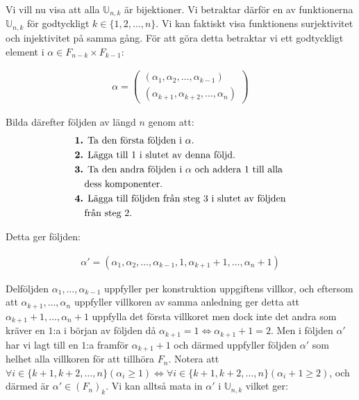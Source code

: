 \documentclass{tufte-handout}
\begin{document}
\begin{ans}
    \vspace{3mm}
    
    Vi vill nu visa att alla $\mathbb{U}_{n, k}$ är bijektioner. Vi betraktar därför en av funktionerna $\mathbb{U}_{n, k}$ för godtyckligt $k \in \{1, 2, \ldots, n\}$. Vi kan faktiskt visa funktionens surjektivitet och injektivitet på samma gång. För att göra detta betraktar vi ett godtyckligt element i $\alpha \in F_{n-k} \times F_{k-1}$:

    \vspace{-4mm}
    
    \begin{align*}
        \alpha = \begin{pmatrix} (\alpha_1, \alpha_2, \ldots, \alpha_{k-1}) \\ (\alpha_{k+1}, \alpha_{k+2}, \ldots, \alpha_{n}) \end{pmatrix}
    \end{align*}

    Bilda därefter följden av längd $n$ genom att:
    \begin{align*}
        &\text{\textbf{1.} Ta den första följden i $\alpha$.} \\
        &\text{\textbf{2.}  Lägga till $1$ i slutet av denna följd.} \\
        &\text{\textbf{3.}  Ta den andra följden i $\alpha$ och addera $1$ till alla} \\
        &\quad \text{dess komponenter.} \\
        &\text{\textbf{4.}  Lägga till följden från steg 3 i slutet av följden} \\
        &\quad \text{från steg 2.}
    \end{align*}

    Detta ger följden:

    \vspace{-4mm}
    
    \begin{align*}
        \alpha' = (\alpha_1, \alpha_2, \ldots, \alpha_{k-1}, 1, \alpha_{k+1} + 1, \ldots, \alpha_n + 1)
    \end{align*}

    Delföljden $\alpha_1, \ldots, \alpha_{k-1}$ uppfyller per konstruktion uppgiftens villkor, och eftersom att $\alpha_{k+1}, \ldots, \alpha_n$ uppfyller villkoren av samma anledning ger detta att $\alpha_{k+1} + 1, \ldots, \alpha_n + 1$ uppfylla det första villkoret men dock inte det andra som kräver en $1$:a i början av följden då $\alpha_{k+1} = 1 \iff \alpha_{k+1} + 1 = 2$. Men i följden $\alpha'$ har vi lagt till en $1$:a framför $\alpha_{k+1} + 1$ och därmed uppfyller följden $\alpha'$ som helhet alla villkoren för att tillhöra $F_n$. Notera att $\forall i \in \{k+1, k+2, \ldots, n\}(\alpha_i \geq 1) \iff \forall i \in \{k+1, k+2, \ldots, n\}(\alpha_i + 1 \geq 2)$, och därmed är $\alpha' \in (F_n)_k$. Vi kan alltså mata in $\alpha'$ i $\mathbb{U}_{n, k}$ vilket ger:


\end{ans}
\end{document}
